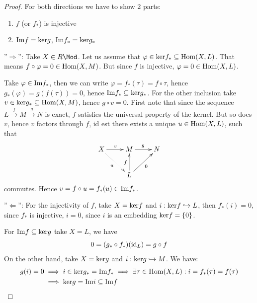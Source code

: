 \documentclass[twoside = false,	%
		headsepline,		%
		parskip = true,
		]{scrbook}						%
\begin{document}
        \begin{proof}
            For both directions we have to show $2$ parts:
        \begin{enumerate}
            \item $f$ (or $f_*$) is injective
            \item $\mathrm{Im} f =\mathrm{ker} g$, $\mathrm{Im} f_* = \mathrm{ker} g_*$
        \end{enumerate}
        ''$\Rightarrow$'': Take $X \in R\Mod$.
        Let us assume that $\varphi \in \mathrm{ker} f_* \subseteq \mathrm{Hom}(X,L)$.
        That means $f \circ \varphi = 0 \in \mathrm{Hom}(X,M)$. But since $f$ is injective, $\varphi = 0 \in \mathrm{Hom}(X,L)$.

        Take $\varphi \in \mathrm{Im} f_*$, then we can write $\varphi = f_* (\tau) = f \circ \tau$, hence
        $g_*(\varphi) = g(f(\tau)) = 0$, hence $\mathrm{Im} f_* \subseteq \mathrm{ker} g_*$.
        For the other inclusion take $v \in \mathrm{ker} g_* \subseteq \mathrm{Hom}(X,M)$, hence $g \circ v = 0$.
        First note that since the sequence $L \xrightarrow{f} M \xrightarrow{g} N$ is exact, $f$ satisfies the
        universal property of the kernel. But so does $v$, hence $v$ factors through $f$, id est there exists a unique $u \in \mathrm{Hom}(X,L)$, such that
        \begin{equation*}
            \xymatrix {
                X \ar[r]^{v} \ar@{.>}[dr]_{u} & M\ar[r]^{g} & N \\
                 & L \ar[u]^{f} \ar[ur]_{0}
            }
        \end{equation*}
        commutes. Hence $v = f \circ u = f_*(u) \in \mathrm{Im} f_*$.

        ''$\Leftarrow$'':
        For the injectivity of $f$, take $X = \mathrm{ker} f$ and $i: \mathrm{ker} f \hookrightarrow L$, then
        $f_*(i) = 0$, since $f_*$ is injective, $i=0$, since $i$ is an embedding $\mathrm{ker} f = \{0\}$.

        For $\mathrm{Im} f \subseteq \mathrm{ker} g$ take $X = L$, we have
        \begin{equation*}
            0 = (g_* \circ f_*)(\mathrm{id}_L) = g \circ f
        \end{equation*}
        On the other hand, take $X = \mathrm{ker} g$ and $i: \mathrm{ker} g \hookrightarrow M$. We have:
        \begin{equation*}
            \begin{split}
                g(i) = 0 &\implies i \in \mathrm{ker} g_* = \mathrm{Im} f_* \implies \exists \tau \in \mathrm{Hom}(X,L): i = f_*(\tau) = f(\tau) \\
                        &\implies \mathrm{ker} g = \mathrm{Im} i \subseteq \mathrm{Im} f
            \end{split}
        \end{equation*}
        \end{proof}
        
\end{document}
